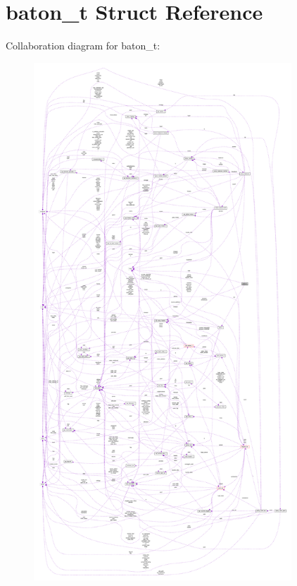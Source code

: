 \hypertarget{structbaton__t}{}\section{baton\+\_\+t Struct Reference}
\label{structbaton__t}


Collaboration diagram for baton\+\_\+t\+:
\nopagebreak
\begin{figure}[H]
\begin{center}
\leavevmode
\includegraphics[height=550pt]{structbaton__t__coll__graph}
\end{center}
\end{figure}
